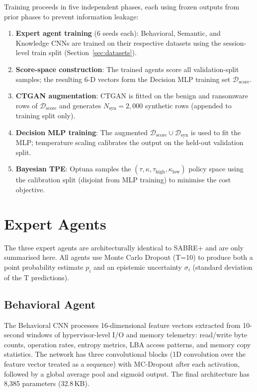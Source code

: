\documentclass[journal]{IEEEtran}
\newcommand{\tauh}{\tau_{\mathrm{high}}}
\newcommand{\klow}{\kappa_{\mathrm{low}}}
\newcommand{\Nsynth}{N_{\mathrm{syn}}}
\begin{document}
Training proceeds in five independent phases, each using frozen outputs
from prior phases to prevent information leakage:
\begin{enumerate}
  \item \textbf{Expert agent training} (6 seeds each): Behavioral, Semantic,
        and Knowledge CNNs are trained on their respective datasets using the
        session-level train split (Section~\ref{sec:datasets}).
  \item \textbf{Score-space construction}: The trained agents score all
        validation-split samples; the resulting 6-D vectors form the Decision
        MLP training set $\mathcal{D}_{\mathrm{score}}$.
  \item \textbf{CTGAN augmentation}: CTGAN is fitted on the benign and
        ransomware rows of $\mathcal{D}_{\mathrm{score}}$ and generates
        $\Nsynth = 2{,}000$ synthetic rows (appended to training split only).
  \item \textbf{Decision MLP training}: The augmented
        $\mathcal{D}_{\mathrm{score}} \cup \mathcal{D}_{\mathrm{syn}}$ is used
        to fit the MLP; temperature scaling calibrates the output on the held-out
        validation split.
  \item \textbf{Bayesian TPE}: Optuna samples the
        $(\tau, \kappa, \tauh, \klow)$ policy space using the calibration split
        (disjoint from MLP training) to minimise the cost objective.
\end{enumerate}


\section{Expert Agents}
\label{sec:agents}

The three expert agents are architecturally identical to SABRE+
\cite{kabuye_sabre_2026} and are only summarised here.
All agents use Monte Carlo Dropout (T=10) to produce both a point
probability estimate $p_i$ and an epistemic uncertainty $\sigma_i$
(standard deviation of the T predictions).

\subsection{Behavioral Agent}

The Behavioral CNN processes 16-dimensional feature vectors extracted
from 10-second windows of hypervisor-level I/O and memory telemetry:
read/write byte counts, operation rates, entropy metrics, LBA access
patterns, and memory copy statistics.
The network has three convolutional blocks (1D convolution over the feature
vector treated as a sequence) with MC-Dropout after each activation,
followed by a global average pool and sigmoid output.
The final architecture has 8,385 parameters (32.8\,KB).
\end{document}
